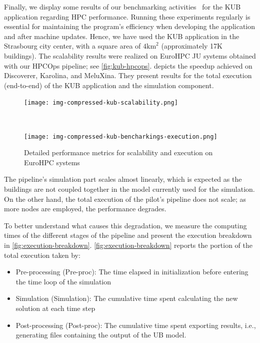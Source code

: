 \documentclass[runningheads]{llncs}
\begin{document}
Finally, we display some results of our benchmarking activities~\cite{hidalgo2_d31_2024} for the KUB application regarding HPC performance.
Running these experiments regularly is essential for maintaining the program's efficiency when developing the application and after machine updates.
Hence, we have used the KUB application in the Strasbourg city center, with a square area of $4 \mathrm{km}^2$ (approximately 17K buildings).
The scalability results were realized on EuroHPC JU systems obtained with our HPCOps pipeline; see \cref{fig:kub-hpcops}.
 depicts the speedup achieved on Discoverer, Karolina, and MeluXina.
They present results for the total execution (end-to-end) of the KUB application and the simulation component.

\begin{figure}  %
  \centering
  \begin{subfloat}{
    \texttt{[image: img-compressed-kub-scalability.png]}
    \label{fig:scalability}
  }\end{subfloat}
  \\
  \begin{subfloat}{
    \texttt{[image: img-compressed-kub-bencharkings-execution.png]}
    \label{fig:execution-breakdown}
  }\end{subfloat}
  \caption{Detailed performance metrics for scalability and execution on EuroHPC systems}
  \label{fig:combined-metrics}
\end{figure}
The pipeline's simulation part scales almost linearly, which is expected as the buildings are not coupled together in the model currently used for the simulation. On the other hand, the total execution of the pilot's pipeline does not scale; as more nodes are employed, the performance degrades.

To better understand what causes this degradation, we measure the computing times of the different stages of the pipeline and present the execution breakdown in \cref{fig:execution-breakdown}. 
\cref{fig:execution-breakdown} reports the portion of the total execution taken by:
\begin{itemize}
\item Pre-processing (Pre-proc): The time elapsed in initialization before entering the time loop of the simulation
\item Simulation (Simulation): The cumulative time spent calculating the new solution at each time step
\item Post-processing (Post-proc): The cumulative time spent exporting results, i.e., generating files containing the output of the UB model.
\end{itemize}
\end{document}
